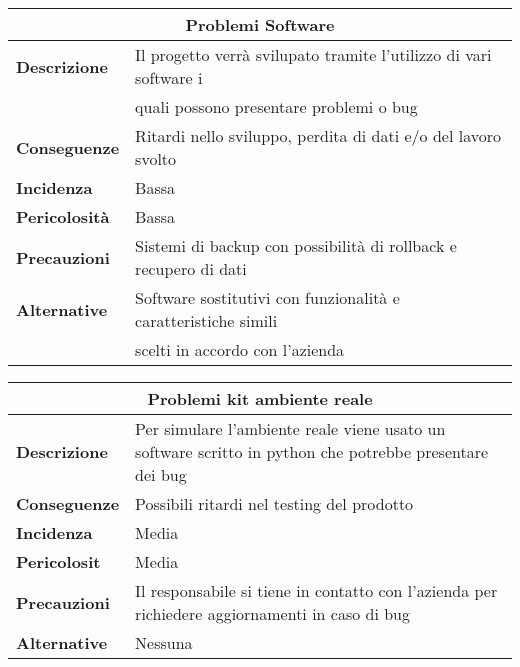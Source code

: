 \begin{center}
    \begin{tabularx}{0.8\linewidth}{l|l}
        \multicolumn{2}{c}{\textbf{Problemi Software}}                                                          \\
        \hline{\textbf{Descrizione}}    & Il progetto verrà svilupato tramite l'utilizzo di vari software i     \\ 
                                        & quali possono presentare problemi o bug                               \\
        \textbf{Conseguenze}            & Ritardi nello sviluppo, perdita di dati e/o del lavoro svolto         \\
        \textbf{Incidenza}              & Bassa                                                                 \\
        \textbf{Pericolosità}           & Bassa                                                                 \\
        \textbf{Precauzioni}            & Sistemi di backup con possibilità di rollback e recupero di dati      \\
        \textbf{Alternative}            & Software sostitutivi con funzionalità e caratteristiche simili        \\ 
                                        & scelti in accordo con l'azienda                                       \\     
    \end{tabularx}
\end{center}

\begin{center}
    \begin{tabularx}{0.8\linewidth}{l|X}
        \multicolumn{2}{c}{\textbf{Problemi kit ambiente reale}}                                                \\
        \hline{\textbf{Descrizione}}    & Per simulare l'ambiente reale viene usato un software scritto in python che potrebbe presentare dei bug\\
        \textbf{Conseguenze}& Possibili ritardi nel testing del prodotto\\
        \textbf{Incidenza} &Media\\
        \textbf{Pericolosit}&Media\\
        \textbf{Precauzioni} & Il responsabile si tiene in contatto con l'azienda per richiedere aggiornamenti in caso di bug\\
        \textbf{Alternative}& Nessuna\\      
    \end{tabularx}
\end{center}

